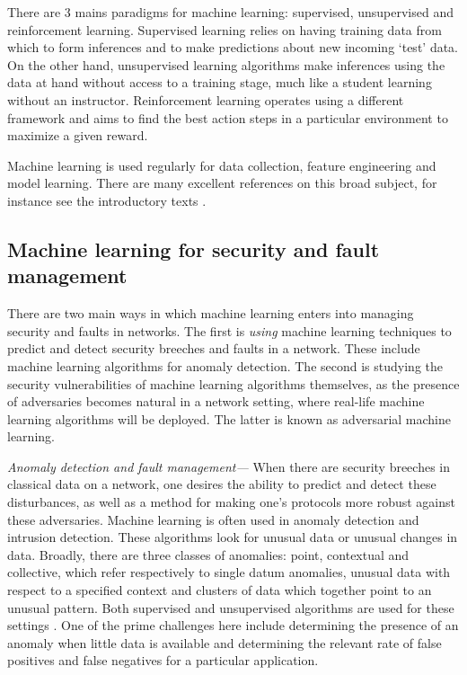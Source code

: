 \documentclass[twocolumn, aps, rmp, amsmath, amssymb, nofootinbib, superscriptaddress, longbibliography, floatfix, table-of-contents, eqsecnum]{revtex4-2}
\begin{document}
There are 3 mains paradigms for machine learning: supervised, unsupervised and reinforcement learning. Supervised learning relies on having training data from which to form inferences and to make predictions about new incoming `test' data. On the other hand, unsupervised learning algorithms make inferences using the data at hand without access to a training stage, much like a student learning without an instructor. Reinforcement learning operates using a different framework and aims to find the best action steps in a particular environment to maximize a given reward.

Machine learning is used regularly for data collection, feature engineering and model learning. There are many excellent references on this broad subject, for instance see the introductory texts \cite{bishop2006pattern, shalev2014understanding, trevor2009elements, marsland2011machine, flach2012machine}.


\subsection{Machine learning for security and fault management}
There are two main ways in which  machine learning enters into managing security and faults in networks. The first is \textit{using} machine learning techniques to predict and detect security breeches and faults in a network. These include machine learning algorithms for anomaly detection. The second is studying the security vulnerabilities of machine learning algorithms themselves, as the presence of adversaries becomes natural in a network setting, where real-life machine learning algorithms will be deployed. The latter is known as adversarial machine learning.

\textit{Anomaly detection and fault management---} When there are security breeches in classical data on a network, one desires the ability to predict and detect these disturbances, as well as a method for making one's protocols more robust against these adversaries. Machine learning is often used in anomaly detection and intrusion detection. These algorithms look for unusual data or unusual changes in data. Broadly, there are three classes of anomalies: point, contextual and collective, which refer respectively to single datum anomalies, unusual data with respect to a specified context and clusters of data which together point to an unusual pattern. Both supervised and unsupervised algorithms are used for these settings \cite{thottan2003anomaly, ahmed2007machine}. One of the prime challenges here include determining the presence of an anomaly when little data is available and determining the relevant rate of false positives and false negatives for a particular application.
\end{document}
